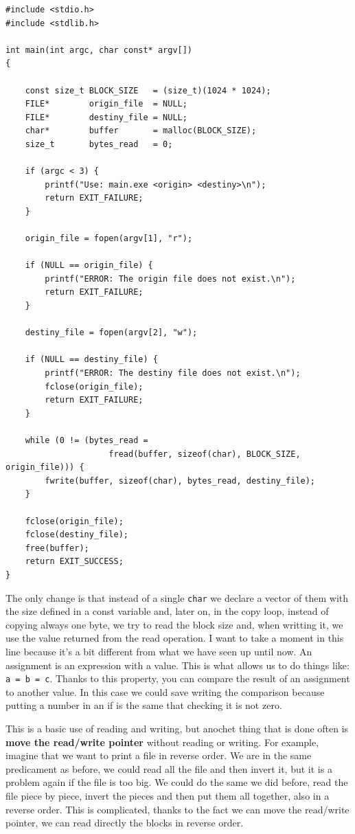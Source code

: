 \documentclass[a4paper]{article}
\begin{document}
\noindent
\begin{minipage}[H]{\linewidth}
\mbox{}
\begin{lstlisting}[style=C,
caption={Example of file copying with a buffer},
label={lst:readWithBuffer}]
#include <stdio.h>
#include <stdlib.h>

int main(int argc, char const* argv[])
{

    const size_t BLOCK_SIZE   = (size_t)(1024 * 1024);
    FILE*        origin_file  = NULL;
    FILE*        destiny_file = NULL;
    char*        buffer       = malloc(BLOCK_SIZE);
    size_t       bytes_read   = 0;

    if (argc < 3) {
        printf("Use: main.exe <origin> <destiny>\n");
        return EXIT_FAILURE;
    }

    origin_file = fopen(argv[1], "r");

    if (NULL == origin_file) {
        printf("ERROR: The origin file does not exist.\n");
        return EXIT_FAILURE;
    }

    destiny_file = fopen(argv[2], "w");

    if (NULL == destiny_file) {
        printf("ERROR: The destiny file does not exist.\n");
        fclose(origin_file);
        return EXIT_FAILURE;
    }

    while (0 != (bytes_read =
                     fread(buffer, sizeof(char), BLOCK_SIZE, origin_file))) {
        fwrite(buffer, sizeof(char), bytes_read, destiny_file);
    }

    fclose(origin_file);
    fclose(destiny_file);
    free(buffer);
    return EXIT_SUCCESS;
}
\end{lstlisting}
\end{minipage}

The only change is that instead of a single \verb!char! we declare a vector of
them with the size defined in a const variable and, later on, in the copy loop,
instead of copying always one byte, we try to read the block size and, when
writting it, we use the value returned from the read operation. I want to take a
moment in this line because it's a bit different from what we have seen up until
now. An assignment is an expression with a value. This is what allows us to do
things like: \verb!a = b = c!. Thanks to this property, you can compare the
result of an assignment to another value. In this case we could save writing the
comparison because putting a number in an if is the same that checking it is not
zero.

This is a basic use of reading and writing, but anochet thing that is done often
is \textbf{move the read/write pointer} without reading or writing. For example,
imagine that we want to print a file in reverse order. We are in the same
predicament as before, we could read all the file and then invert it, but it is
a problem again if the file is too big. We could do the same we did before, read
the file piece by piece, invert the pieces and then put them all together, also
in a reverse order. This is complicated, thanks to the fact we can move the
read/write pointer, we can read directly the blocks in reverse order.
\end{document}
